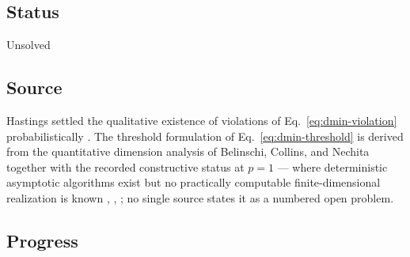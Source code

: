 \subsection*{Status}

Unsolved

\subsection*{Source}

Hastings settled the qualitative existence of violations of
Eq.~\eqref{eq:dmin-violation} probabilistically
.  The threshold formulation of
Eq.~\eqref{eq:dmin-threshold} is derived from the quantitative dimension
analysis of Belinschi, Collins, and Nechita
 together with the recorded constructive status at $p=1$ --- where
deterministic asymptotic algorithms exist but no practically computable
finite-dimensional realization is known ,
, ;
no single source states it as a numbered open problem.

\subsection*{Progress}

